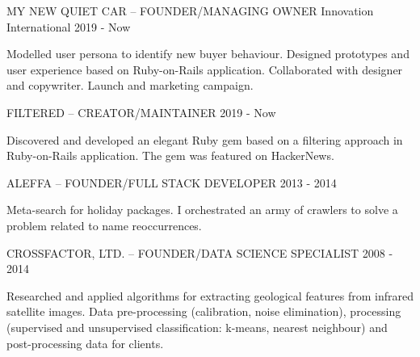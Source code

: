 


\begin{cventries}

  \cventry
    {MY NEW QUIET CAR – FOUNDER/MANAGING OWNER} %
    {Innovation} %
    {International} %
    {2019 - Now} %
    {
      \begin{cvitems} %
        \item {Modelled user persona to identify new buyer behaviour. Designed prototypes and user experience based on Ruby-on-Rails application. Collaborated with designer and copywriter. Launch and marketing campaign.}
      \end{cvitems}
    }

    \cventry
    {FILTERED – CREATOR/MAINTAINER} %
    {} %
    {} %
    {2019 - Now} %
    {
      \begin{cvitems} %
        \item {Discovered and developed an elegant Ruby gem based on a filtering approach in Ruby-on-Rails application. The gem was featured on HackerNews.}
      \end{cvitems}
    }

    \cventry
    {ALEFFA – FOUNDER/FULL STACK DEVELOPER} %
    {} %
    {} %
    {2013 - 2014} %
    {
      \begin{cvitems} %
        \item {Meta-search for holiday packages. I orchestrated an army of crawlers to solve a problem related to name reoccurrences.}
      \end{cvitems}
    }

    \cventry
    {CROSSFACTOR, LTD. – FOUNDER/DATA SCIENCE SPECIALIST} %
    {} %
    {} %
    {2008 - 2014} %
    {
      \begin{cvitems} %
        \item {Researched and applied algorithms for extracting geological features from infrared satellite images. Data pre-processing (calibration, noise elimination), processing (supervised and unsupervised classification: k-means, nearest neighbour) and post-processing data for clients.}
      \end{cvitems}
    }


\end{cventries}
